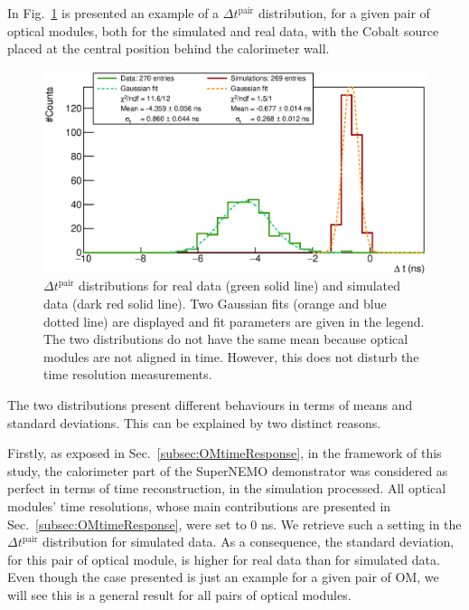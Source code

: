 In Fig.~\ref{fig:Co_deltat} is presented an example of a $\Delta t^{\text{pair}}$ distribution, for a given pair of optical modules, both for the simulated and real data, with the Cobalt source placed at the central position behind the calorimeter wall.
\begin{figure}[h]
  \centering
  \includegraphics[width=15cm]{commissioning/fig_commissioning/Co_deltat_distrib_ex.eps}
  \caption{$\Delta t^{\text{pair}}$ distributions for real data (green solid line) and simulated data (dark red solid line).
    Two Gaussian fits (orange and blue dotted line) are displayed and fit parameters are given in the legend.
    The two distributions do not have the same mean because optical modules are not aligned in time.
    However, this does not disturb the time resolution measurements.
    \label{fig:Co_deltat}}
\end{figure}
The two distributions present different behaviours in terms of means and standard deviations.
This can be explained by two distinct reasons.

Firstly, as exposed in Sec.~\ref{subsec:OMtimeResponse}, in the framework of this study, the calorimeter part of the SuperNEMO demonstrator was considered as perfect in terms of time reconstruction, in the simulation processed.
All optical modules' time resolutions, whose main contributions are presented in Sec.~\ref{subsec:OMtimeResponse}, were set to $0$ ns.
We retrieve such a setting in the $\Delta t^{\text{pair}}$ distribution for simulated data.
As a consequence, the standard deviation, for this pair of optical module, is higher for real data than for simulated data.
Even though the case presented is just an example for a given pair of OM, we will see this is a general result for all pairs of optical modules.

